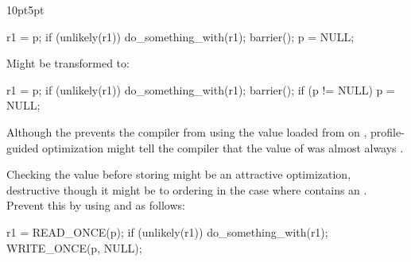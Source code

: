 \begin{description}[labelsep=.4em]
\begin{listing}[tb]
\begin{adjustwidth}{10pt}{5pt}
\footnotesize
\begin{fcvlabel}
\renewcommand{\myfvline}{A\arabic{FancyVerbLine}}
\begin{VerbatimT}[commandchars=\\\[\]]
r1 = p;					\lnlbl[A1]
if (unlikely(r1))			\lnlbl[A2]
	do_something_with(r1);		\lnlbl[A3]
barrier();				\lnlbl[A4]
p = NULL;				\lnlbl[A5]
\end{VerbatimT}
Might be transformed to:
\renewcommand{\myfvline}{B\arabic{FancyVerbLine}}
\begin{VerbatimT}[commandchars=\\\[\]]
r1 = p;					\lnlbl[B1]
if (unlikely(r1))			\lnlbl[B2]
	do_something_with(r1);		\lnlbl[B3]
barrier();				\lnlbl[B4]
if (p != NULL)				\lnlbl[B5]
	p = NULL;			\lnlbl[B6]
\end{VerbatimT}
\begin{fcvref}
Although the  prevents the compiler from using the value
loaded from  on , profile-guided optimization might tell
the compiler that the value of  was almost always .
\end{fcvref}
Checking the value before storing might be an attractive optimization,
destructive though it might be to ordering in the case where
 contains an .
Prevent this by using  and  as follows:
\renewcommand{\myfvline}{C\arabic{FancyVerbLine}}
\begin{VerbatimT}[commandchars=\\\[\]]
r1 = READ_ONCE(p);			\lnlbl[C1]
if (unlikely(r1))			\lnlbl[C2]
	do_something_with(r1);		\lnlbl[C3]
WRITE_ONCE(p, NULL);			\lnlbl[C4]
\end{VerbatimT}
\end{fcvlabel}
\end{adjustwidth}
\caption{Store-to-Load Conversion}
\label{lst:toolsoftrade:Store-to-Load Conversion}
\end{listing}


\end{description}
